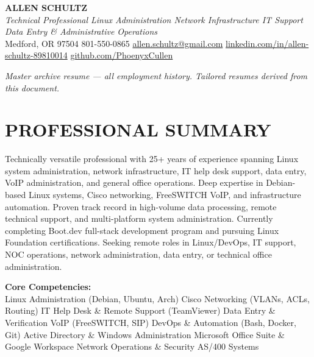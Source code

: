 \documentclass[9pt,letterpaper]{extarticle}
\begin{document}
\begin{center}
  {\LARGE\bfseries\color{accent} ALLEN SCHULTZ}\\[3pt]
  {\normalsize\itshape Technical Professional \textbar{} Linux Administration \textbar{} Network Infrastructure \textbar{} IT Support \textbar{} Data Entry \& Administrative Operations}\\[4pt]
  {\small
    Medford, OR 97504 \textbar{} 801-550-0865 \textbar{}
    \href{mailto:allen.schultz@gmail.com}{allen.schultz@gmail.com} \textbar{}
    \href{https://linkedin.com/in/allen-schultz-89810014}{linkedin.com/in/allen-schultz-89810014} \textbar{}
    \href{https://github.com/PhoenyxCullen}{github.com/PhoenyxCullen}
  }
\end{center}
\vspace{2pt}
\noindent\textit{\small Master archive resume --- all employment history. Tailored resumes derived from this document.}

\section*{PROFESSIONAL SUMMARY}

Technically versatile professional with 25+ years of experience spanning Linux system administration, network infrastructure, IT help desk support, data entry, VoIP administration, and general office operations. Deep expertise in Debian-based Linux systems, Cisco networking, FreeSWITCH VoIP, and infrastructure automation. Proven track record in high-volume data processing, remote technical support, and multi-platform system administration. Currently completing Boot.dev full-stack development program and pursuing Linux Foundation certifications. Seeking remote roles in Linux/DevOps, IT support, NOC operations, network administration, data entry, or technical office administration.

\smallskip
\textbf{Core Competencies:}\\
Linux Administration (Debian, Ubuntu, Arch) \textbullet{}
Cisco Networking (VLANs, ACLs, Routing) \textbullet{}
IT Help Desk \& Remote Support (TeamViewer) \textbullet{}
Data Entry \& Verification \textbullet{}
VoIP (FreeSWITCH, SIP) \textbullet{}
DevOps \& Automation (Bash, Docker, Git) \textbullet{}
Active Directory \& Windows Administration \textbullet{}
Microsoft Office Suite \& Google Workspace \textbullet{}
Network Operations \& Security \textbullet{}
AS/400 Systems
\end{document}

